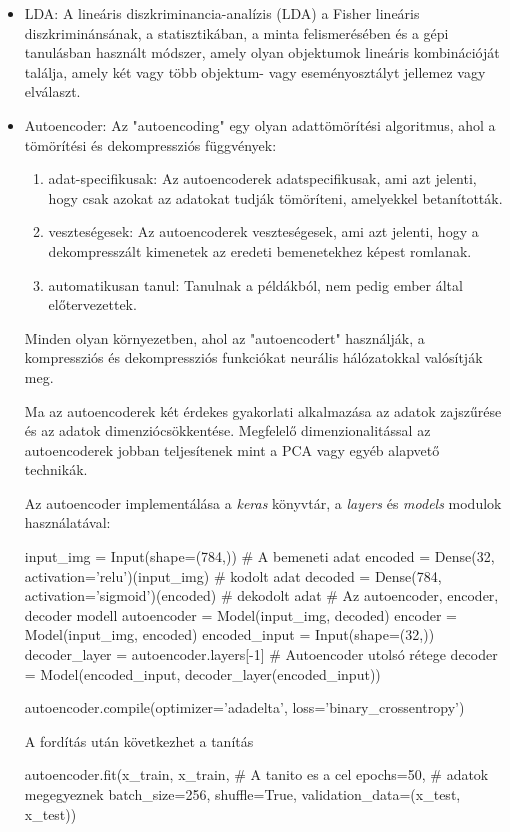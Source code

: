 \begin{itemize}
\item LDA\cite{wang2003feature}: A lineáris diszkriminancia-analízis (LDA) a Fisher lineáris diszkriminánsának, a statisztikában, a minta felismerésében és a gépi tanulásban használt módszer, amely olyan objektumok lineáris kombinációját találja, amely két vagy több objektum- vagy eseményosztályt jellemez vagy elválaszt.
\item Autoencoder: Az "autoencoding" egy olyan adattömörítési algoritmus, ahol a tömörítési és dekompressziós függvények:
\begin{enumerate}
\item adat-specifikusak: Az autoencoderek adatspecifikusak, ami azt jelenti, hogy csak azokat az adatokat tudják tömöríteni, amelyekkel betanították.
\item veszteségesek: Az autoencoderek veszteségesek, ami azt jelenti, hogy a dekompresszált kimenetek az eredeti bemenetekhez képest romlanak.
\item automatikusan tanul: Tanulnak a példákból, nem pedig ember által előtervezettek.
\end{enumerate}
Minden olyan környezetben, ahol az "autoencodert" használják, a kompressziós és dekompressziós funkciókat neurális hálózatokkal valósítják meg.

Ma az autoencoderek két érdekes gyakorlati alkalmazása az adatok zajszűrése és az adatok dimenziócsökkentése. Megfelelő dimenzionalitással az autoencoderek jobban teljesítenek mint a PCA vagy egyéb alapvető technikák.

Az autoencoder implementálása a \textit{keras} könyvtár, a  \textit{layers} és \textit{models} modulok használatával:
\begin{python}
input_img = Input(shape=(784,)) # A bemeneti adat
encoded = Dense(32, activation='relu')(input_img) # kodolt adat
decoded = Dense(784, activation='sigmoid')(encoded) # dekodolt adat
# Az autoencoder, encoder, decoder modell
autoencoder = Model(input_img, decoded)
encoder = Model(input_img, encoded)
encoded_input = Input(shape=(32,))
decoder_layer = autoencoder.layers[-1] # Autoencoder utolsó rétege
decoder = Model(encoded_input, decoder_layer(encoded_input))
\end{python}
\begin{python}
autoencoder.compile(optimizer='adadelta', loss='binary_crossentropy')
\end{python}
A fordítás után következhet a tanítás
\begin{python}
autoencoder.fit(x_train, x_train,	# A tanito es a cel
                epochs=50,		# adatok megegyeznek
                batch_size=256,
                shuffle=True,
                validation_data=(x_test, x_test))
\end{python}
\end{itemize}

